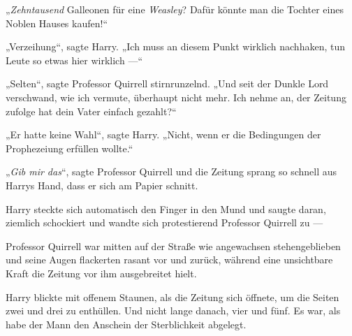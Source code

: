 „\emph{Zehntausend} Galleonen für eine \emph{Weasley}? Dafür könnte man die Tochter eines Noblen Hauses kaufen!“

„Verzeihung“, sagte Harry.
„Ich muss an diesem Punkt wirklich nachhaken, tun Leute so etwas hier wirklich —“

„Selten“, sagte Professor Quirrell stirnrunzelnd.
„Und seit der Dunkle Lord verschwand, wie ich vermute, überhaupt nicht mehr. Ich nehme an, der Zeitung zufolge hat dein Vater einfach gezahlt?“

„Er hatte keine Wahl“, sagte Harry.
„Nicht, wenn er die Bedingungen der Prophezeiung erfüllen wollte.“

„\emph{Gib mir das}“, sagte Professor Quirrell und die Zeitung sprang so schnell aus Harrys Hand, dass er sich am Papier schnitt.

Harry steckte sich automatisch den Finger in den Mund und saugte daran, ziemlich schockiert und wandte sich protestierend Professor Quirrell zu —

Professor Quirrell war mitten auf der Straße wie angewachsen stehengeblieben und seine Augen flackerten rasant vor und zurück, während eine unsichtbare Kraft die Zeitung vor ihm ausgebreitet hielt.

Harry blickte mit offenem Staunen, als die Zeitung sich öffnete, um die Seiten zwei und drei zu enthüllen. Und nicht lange danach, vier und fünf. Es war, als habe der Mann den Anschein der Sterblichkeit abgelegt.

